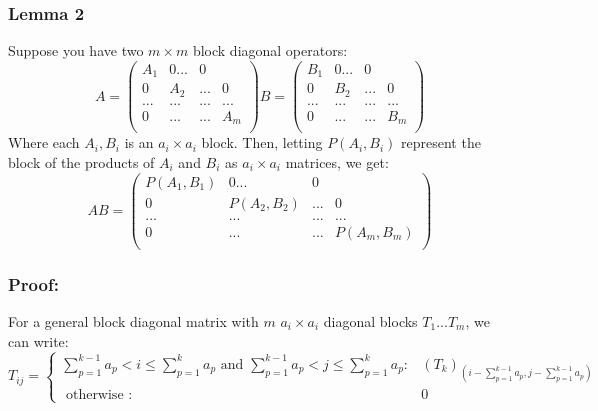 \documentclass{article}
\begin{document}
\subsubsection*{Lemma 2}
Suppose you have two $m \times m$ block diagonal operators:
\[
A = \begin{pmatrix} 
A_{1} & 0 ... & 0\\
0 & A_{2} & ... & 0\\
... &... &... & ...\\
0 & ... & ... & A_{m}\\
\end{pmatrix}
B = \begin{pmatrix}
B_{1} & 0 ... & 0\\
0 & B_{2} & ... & 0\\
... &... &... & ...\\
0 & ... & ... &B_{m}\\
\end{pmatrix}
\]
Where each $A_{i}, B_{i}$ is an $a_{i} \times a_{i}$ block. Then, letting $P(A_{i}, B_{i})$ represent the block of the products of $A_{i}$ and $B_{i}$ as $a_{i} \times a_{i}$ matrices, we get:
\[
AB = \begin{pmatrix}
P(A_{1}, B_{1}) & 0 ... & 0\\
0 & P(A_{2}, B_{2}) & ... & 0\\
... &... &... & ...\\
0 & ... & ... & P(A_{m}, B_{m})\\
\end{pmatrix}
\]
\subsubsection*{Proof:}
For a general block diagonal matrix with $m$ $a_{i} \times a_{i}$ diagonal blocks $T_{1} ... T_{m}$, we can write:
\[T_{ij} = \begin{cases}
\sum_{p=1}^{k-1}a_{p} < i \leq \sum_{p=1}^{k}a_{p} \text{ and } \sum_{p=1}^{k-1}a_{p} < j \leq \sum_{p=1}^{k}a_{p}: & (T_{k})_{(i - \sum_{p=1}^{k-1}a_{p}, j - \sum_{p=1}^{k-1}a_{p})}\\
\text{ otherwise }: & 0
\end{cases}
\]
\end{document}
